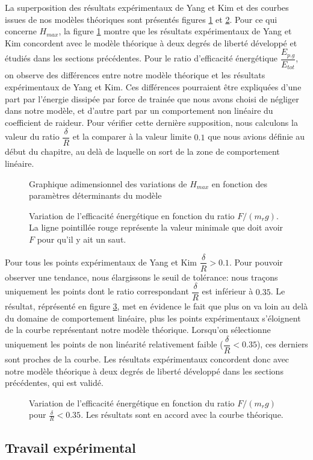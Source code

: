La superposition des résultats expérimentaux de Yang et Kim et des courbes issues de nos modèles théoriques sont présentés figures \ref{fig:ykmae} et \ref{fig:yke}.
Pour ce qui concerne $H_{max}$, la figure \ref{fig:ykmae} montre que les résultats expérimentaux de Yang et Kim concordent avec le modèle théorique à deux degrés de liberté développé et étudiés dans les sections précédentes.
Pour le ratio d'efficacité énergétique $\dfrac{E_{p.g}}{E_{tot}}$, on observe des différences entre notre modèle théorique et les résultats expérimentaux de Yang et Kim.
Ces différences pourraient être expliquées d'une part par l'énergie dissipée par force de trainée que nous avons choisi de négliger dans notre modèle, et d'autre part par un comportement non linéaire du coefficient de raideur. Pour vérifier cette dernière supposition, nous calculons la valeur du ratio $\dfrac{\delta}{R}$ et la comparer à la valeur limite $0.1$ que nous avions définie au début du chapitre, au delà de laquelle on sort de la zone de comportement linéaire.

\begin{figure}[htb]
\centering
\def\svgwidth{320}

\caption{Graphique adimensionnel des variations de $H_{max}$ en fonction des paramètres déterminants du modèle}
\label{fig:ykmae}
\end{figure}

\begin{figure}[htb]
\centering
\def\svgwidth{320}

\caption{Variation de l'efficacité énergétique en fonction du ratio $F/(m_r g)$. La ligne pointillée rouge représente la valeur minimale que doit avoir $F$ pour qu'il y ait un saut.}
\label{fig:yke}
\end{figure}

Pour tous les points expérimentaux de Yang et Kim $\dfrac{\delta}{R}>0.1$. Pour pouvoir observer une tendance, nous élargissons le seuil de tolérance: nous traçons uniquement les points dont le ratio correspondant $\dfrac{\delta}{R}$ est inférieur à $0.35$. Le résultat, réprésenté en figure \ref{fig:ytol}, met en évidence le fait que plus on va loin au delà du domaine de comportement linéaire, plus les points expérimentaux s'éloignent de la courbe représentant notre modèle théorique. Lorsqu'on sélectionne uniquement les points de non linéarité relativement faible ($\dfrac{\delta}{R}<0.35$), ces derniers sont proches de la courbe.
Les résultats expérimentaux concordent donc avec notre modèle théorique à deux degrés de liberté développé dans les sections précédentes, qui est validé.

\begin{figure}[htb]
\centering
\def\svgwidth{320}

\caption{Variation de l'efficacité énergétique en fonction du ratio $F/(m_r g)$ pour $\frac{\delta}{R}<0.35$. Les résultats sont en accord avec la courbe théorique.}
\label{fig:ytol}
\end{figure}


\subsection{Travail expérimental}